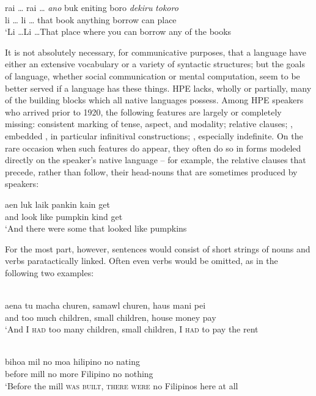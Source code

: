 
\ea\label{ex:13}
\gll rai \ldots {} rai \ldots {} \emph{ano} buk eniting boro \emph{dekiru} \emph{tokoro}\\
li \ldots {} li \ldots {} that book anything borrow can place\\
\glt `Li \ldots  Li \ldots  That place where you can borrow any of the books
\z

It is not absolutely necessary, for communicative purposes, that a language have either an extensive vocabulary or a variety of syntactic structures; but the goals of language, whether social communication or mental computation, seem to be better served if a language has these things. HPE lacks, wholly or partially, many of the building blocks which all native languages possess. Among HPE speakers who arrived prior to 1920, the following features are largely or completely missing: consistent marking of tense, aspect, and modality; relative clauses; , embedded , in particular infinitival con\-structions; , especially indefinite. On the rare occasion when such features do appear, they often do so in forms modeled directly on the speaker's native language -- for example, the relative clauses that precede, rather than follow, their head-nouns that are sometimes produced by  speakers:

\ea\label{ex:14}
\gll aen luk laik pankin kain get\\
and look like pumpkin kind get \\
\glt  `And there were some that looked like pumpkins
\z

For the most part, however, sentences would consist of short strings of nouns and verbs paratactically linked. Often even verbs would be omitted, as in the following two examples:

\ea\label{ex:15}
\\
\gll aena tu macha churen, samawl churen, haus mani pei\\
and too much children, small children, house money pay\\
\glt `And I \textsc{had} too many children, small children, I \textsc{had} to pay the rent
\z

\ea\label{ex:16}
\\
\gll bihoa mil no moa hilipino no nating\\
before mill no more Filipino no nothing\\ 
\glt  `Before the mill \textsc{was built, there were} no Filipinos here at all 
\z

